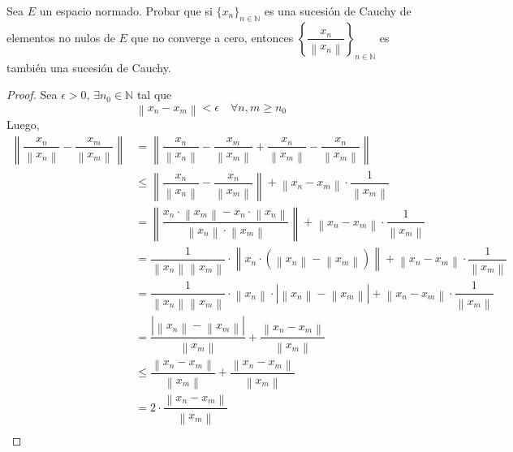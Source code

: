 \documentclass{article}
\theoremstyle{definition}
\newcommand{\N}{\mathbb{N}}
\newcommand{\norm}[1]{\left\lVert #1 \right\rVert}       %
\newenvironment{ejercicio}[1]{\begin{trivlist}
\item[\hskip \labelsep {\bfseries Ejercicio}\hskip \labelsep {\bfseries #1.}]}{\end{trivlist}}
\begin{document}
\vspace{0.5cm}

\begin{ejercicio}{4}
    Sea \(E\) un espacio normado. Probar que si \( {\{x_n\}}_{n\in\N}\) es una sucesión de Cauchy de elementos no nulos de \(E\) que no converge a cero, entonces \( {\left \{ \dfrac{x_n}{\norm{x_n}} \right \}}_{n\in\N}\) es también una sucesión de Cauchy.
\end{ejercicio}
\begin{proof}
    Sea \( \epsilon > 0 \), \( \exists n_0 \in \N \) tal que \[
        \norm{x_n - x_m} < \epsilon \quad \forall n,m \geq n_0
    \]
    Luego, \begin{align*}
        \norm{ \dfrac{x_n}{\norm{x_n}} - \dfrac{x_m}{\norm{x_m}} } & = \norm{ \dfrac{x_n}{\norm{x_n}} - \dfrac{x_m}{\norm{x_m}} + \dfrac{x_n}{\norm{x_m}} - \dfrac{x_n}{\norm{x_m}} }                           \\
                                                                   & \leq \norm{ \dfrac{x_n}{\norm{x_n}} - \dfrac{x_n}{\norm{x_m}}} + \norm{x_n - x_m} \cdot \dfrac{1}{\norm{x_m}}                              \\
                                                                   & = \norm{ \dfrac{x_n \cdot \norm{x_m} - x_n \cdot \norm{x_n}}{\norm{x_n} \cdot \norm{x_m}} } + \norm{x_n - x_m} \cdot \dfrac{1}{\norm{x_m}} \\
                                                                   & = \dfrac{1}{\norm{x_n}\norm{x_m}} \cdot \norm{x_n \cdot (\norm{x_n} - \norm{x_m})} + \norm{x_n - x_m} \cdot \dfrac{1}{\norm{x_m}}          \\
                                                                   & = \dfrac{1}{\norm{x_n}\norm{x_m}} \cdot \norm{x_n} \cdot |\norm{x_n} - \norm{x_m}| + \norm{x_n - x_m} \cdot \dfrac{1}{\norm{x_m}}          \\
                                                                   & = \dfrac{|\norm{x_n} - \norm{x_m}|}{\norm{x_m}} + \dfrac{\norm{x_n - x_m}}{\norm{x_m}}                                                     \\
                                                                   & \leq \dfrac{\norm{x_n - x_m}}{\norm{x_m}} + \dfrac{\norm{x_n - x_m}}{\norm{x_m}}                                                           \\
                                                                   & = 2 \cdot \dfrac{\norm{x_n - x_m}}{\norm{x_m}}                                                                                             \\

\end{align*}
\end{proof}
\end{document}
